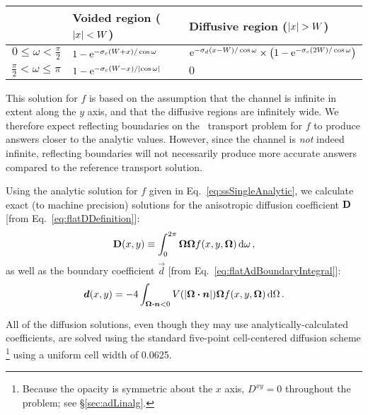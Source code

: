\begin{table}[htb]
  \centering
  \begin{tabular}{rll}
\toprule
& Voided region ($\left| x \right| < W$) & Diffusive region ($\left| x \right| > W$)
\\ \midrule
  $0 \le \omega < \frac{\pi}{2}$
&
  $1 - \mathop{}\!\mathrm{e}^{ - \sigma_c (W + x) / \cos \omega}$
& 
  $\mathop{}\!\mathrm{e}^{ - \sigma_d (x - W) / \cos \omega} \times
  \left( 1 - \mathop{}\!\mathrm{e}^{ - \sigma_c (2W) / \cos \omega} \right)
  $
\\
  $\frac{\pi}{2} < \omega \le \pi$
&
  $1 - \mathop{}\!\mathrm{e}^{ - \sigma_c (W - x) / \left|  \cos \omega \right| }$
&
$0$
\\ \bottomrule
  \end{tabular}
  \label{tab:ssSingleAnalytic}
\end{table}

This solution for $f$ is based on the assumption that the channel is
infinite in extent along the $y$ axis, and that the diffusive regions are
infinitely wide. We therefore expect reflecting boundaries on the \SN\ transport
problem for $f$ to produce answers closer to the analytic values. However, since
the channel is \emph{not} indeed infinite, reflecting boundaries will not
necessarily produce more accurate answers compared to the reference transport
solution.

Using the analytic solution for $f$ given in
Eq.~\eqref{eq:ssSingleAnalytic}, we calculate exact (to machine precision)
solutions for the anisotropic diffusion coefficient $\mathbf{D}$
[from Eq.~\eqref{eq:flatDDefinition}]:
\begin{equation*}
  \mathbf{D}(x,y) \equiv \int_{0}^{2\pi} \bm{\Omega} \bm{\Omega}
  f(x,y, \bm{\Omega}) \mathop{}\!\mathrm{d}\omega \,,
\end{equation*}
as well as the boundary coefficient $\vec{d}$
[from Eq.~\eqref{eq:flatAdBoundaryIntegral}]:
\begin{equation*}
  \bm{d}(x,y) = -4\int_{\bm{\Omega}\bm{\cdot}\bm{n} < 0}
  V(\left| \bm{\Omega}\bm{\cdot}\bm{n} \right|)
\bm{\Omega} f(x,y, \bm{\Omega}) \mathop{}\!\mathrm{d}\Omega\,.
\end{equation*}

All of the diffusion solutions, even though they may use analytically-calculated
coefficients, are solved using the standard five-point cell-centered diffusion
scheme%
\footnote{%
Because the opacity is symmetric about the $x$ axis, $D^{xy}=0$
throughout the problem; see \S\ref{sec:adLinalg}.
} using a uniform cell width of 0.0625.

